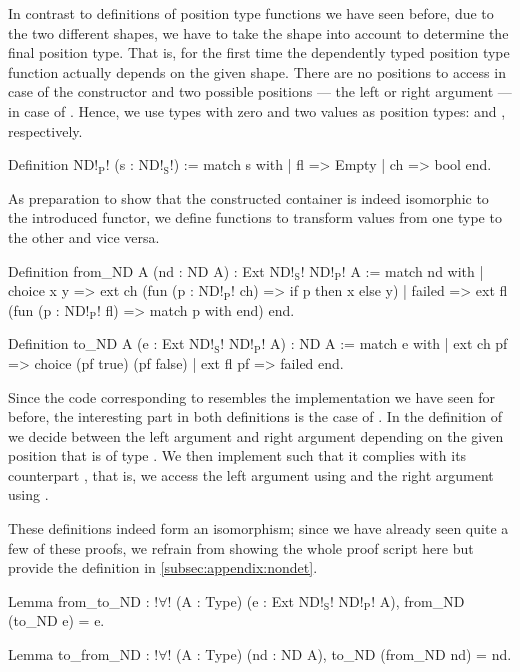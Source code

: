 In contrast to definitions of position type functions we have seen before, due to the two different shapes, we have to take the shape into account to determine the final position type.
That is, for the first time the dependently typed position type function actually depends on the given shape.
There are no positions to access in case of the  constructor and two possible positions --- the left or right argument --- in case of .
Hence, we use types with zero and two values as position types:  and , respectively.

\begin{coqcode}
Definition ND!$_\text{P}$! (s : ND!$_\text{S}$!) :=
 match s with
 | fl => Empty
 | ch => bool
 end.
\end{coqcode}

As preparation to show that the constructed container is indeed isomorphic to the introduced functor, we define functions to transform values from one type to the other and vice versa.

\begin{coqcode}
Definition from_ND A (nd : ND A) : Ext ND!$_\text{S}$! ND!$_\text{P}$! A :=
 match nd with
 | choice x y => ext ch (fun (p : ND!$_\text{P}$! ch) => if p then x else y)
 | failed     => ext fl (fun (p : ND!$_\text{P}$! fl) => match p with end)
 end.

Definition to_ND A (e : Ext ND!$_\text{S}$! ND!$_\text{P}$! A) : ND A :=
 match e with
 | ext ch pf => choice (pf true) (pf false)
 | ext fl pf => failed
 end.
\end{coqcode}

Since the code corresponding to  resembles the implementation we have seen for  before, the interesting part in both definitions is the case of .
In the definition of  we decide between the left argument  and right argument  depending on the given position  that is of type .
We then implement  such that it complies with its counterpart , that is, we access the left argument using  and the right argument using .

These definitions indeed form an isomorphism; since we have already seen quite a few of these proofs, we refrain from showing the whole
proof script here but provide the definition in \autoref{subsec:appendix:nondet}.

\begin{coqcode}
Lemma from_to_ND : !$\forall$! (A : Type) (e : Ext ND!$_\text{S}$! ND!$_\text{P}$! A),
   from_ND (to_ND e) = e.

Lemma to_from_ND : !$\forall$! (A : Type) (nd : ND A),
   to_ND (from_ND nd) = nd.
\end{coqcode}

